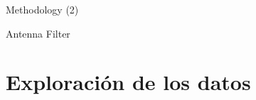 \documentclass{beamer}
\begin{document}
\begin{frame}{Methodology (2)}
\begin{block}{Antenna Filter}
		
		
	\end{block}
\end{frame}

\section{Exploración de los datos}
\end{document}
